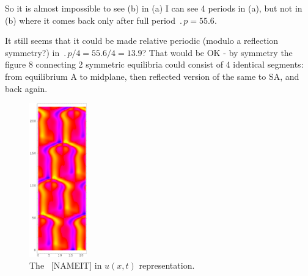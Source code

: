 So it is almost impossible to see (b) %
in (a) %
I can see 4 periods in (a), %
but not in (b) %
where it comes back only after full period $\period{p}=55.6$.

It still seems that it could be made relative periodic 
(modulo a reflection symmetry?)
in $\period{p}/4=55.6/4=13.9$? That would be OK 
-
by symmetry the figure 8 connecting
2 symmetric equilibria could consist of 4 identical segments: from
equilibrium A to midplane, then reflected version of the same to SA, and
back again.


\begin{figure}[t] %
\centering
 	\includegraphics[width=2.5cm]{figs/rpo22-55-4-u.eps}
\hspace{0.1in}
\caption{
 The \rpo\ [NAMEIT] in $u(x,t)$ representation. 
        }
\label{f:rpoNAMEITu}
\end{figure}


